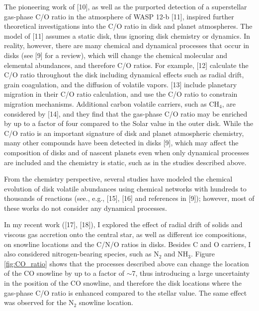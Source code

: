 \documentclass[12pt, letterpaper]{article}
\begin{document}
The pioneering work of [10], as well as the purported detection of a superstellar gas-phase C/O ratio in the atmosphere of WASP 12-b [11], inspired further theoretical investigations into the C/O ratio in disk and planet atmospheres. The model of [11] assumes a static disk, thus ignoring disk chemistry or dynamics. In reality, however, there are many chemical and dynamical processes that occur in disks (see [9] for a review), which will change the chemical molecular and elemental abundances, and therefore C/O ratios. For example, [12] calculate the C/O ratio throughout the disk including dynamical effects such as radial drift, grain coagulation, and the diffusion of volatile vapors. [13] include planetary migration in their C/O ratio calculation, and use the C/O ratio to constrain migration mechanisms. Additional carbon volatile carriers, such as CH$_4$, are considered by [14],  and they find that the gas-phase C/O ratio may be enriched by up to a factor of four compared to the Solar value in the outer disk.  While the C/O ratio is an important signature of disk and planet atmospheric chemistry, many other compounds have been detected in disks [9], which may affect the composition of disks and of nascent planets even when only dynamical processes are included and the chemistry is static, such as in the studies described above. 

From the chemistry perspective, several studies have modeled the chemical evolution of disk volatile abundances using chemical networks with hundreds to thousands of reactions (see., e.g., [15], [16] and references in [9]); however, most of these works do not consider any dynamical processes.   

In my recent work ([17], [18]), I explored the effect of radial drift of solids and viscous gas accretion onto the central star, as well as different ice compositions, on snowline locations and the C/N/O ratios in disks. Besides C and O carriers, I also considered nitrogen-bearing species, such as N$_2$ and NH$_3$. Figure \ref{fig:CO_ratio} shows that the processes described above can change the location of the CO snowline by up to a factor of $\sim$7, thus introducing a large uncertainty in the position of the CO snowline, and therefore the disk locations where the gas-phase C/O ratio is enhanced compared to the stellar value. The same effect was observed for the N$_2$ snowline location.
\end{document}

